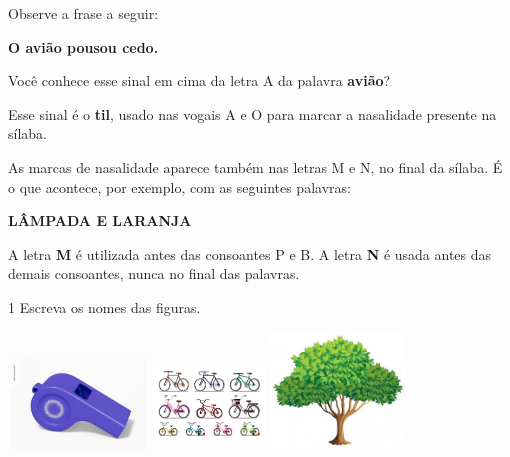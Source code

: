 {Observe a frase a seguir:

\textbf{O avião pousou cedo.}

Você conhece esse sinal em cima da letra A da palavra \textbf{avião}?

Esse sinal é o \textbf{til}, usado nas vogais A e O para marcar a
nasalidade presente na sílaba.

As marcas de nasalidade aparece também nas letras M e N, no final da
sílaba. É o que acontece, por exemplo, com as seguintes palavras:

\textbf{LÂMPADA E LARANJA}

A letra \textbf{M} é utilizada antes das consoantes P e B.  
A letra \textbf{N} é usada antes das demais consoantes, nunca 
no final das palavras.
}


\num{1} Escreva os nomes das figuras.


\includegraphics[width=1.46154in,height=0.93603in]{media/image49.jpeg}
\includegraphics[width=1.16587in,height=0.93269in]{media/image50.jpeg}
\includegraphics[width=1.42308in,height=1.21950in]{media/image51.jpeg}




